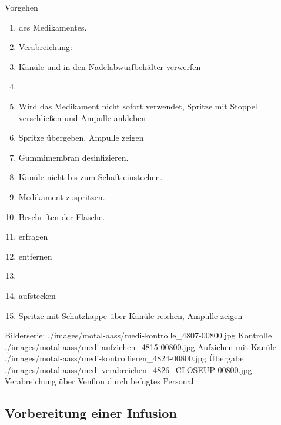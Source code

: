 \documentclass[
ngerman,
paper=a4,
asymmetric,
fontsize=8pt,
draft=false,
numbers=noenddot,
bibtotocnumbered,
footnotes=multiple,
toc=flat,
]{scrbook}
\begin{document}
\begin{ProcedureStepsWide}{Vorgehen}
\begin{enumerate}
  Beim Einführen der Kanüle in die Ampulle den
    Ampullenrand nicht berühren.
  \item {} des
  Medikamentes.
  \item Verabreichung:
    \item Kanüle  und in den
    Nadelabwurfbehälter verwerfen -- 
    \item {}
    \item Wird das Medikament nicht sofort verwendet, Spritze mit
    Stoppel verschließen und Ampulle ankleben
    \item Spritze übergeben, Ampulle zeigen
    \item Gummimembran desinfizieren.
    \item Kanüle nicht bis zum Schaft einstechen.
    \item Medikament zuspritzen.
    \item Beschriften der Flasche.
    \item {} erfragen
    \item {}  entfernen
    \item {}
    \item {} aufstecken
    \item Spritze mit Schutzkappe über Kanüle reichen, Ampulle zeigen
\end{enumerate}
\end{ProcedureStepsWide}


\begin{PictureSeriesWide}{}{Bilderserie:  }
{./images/motal-aass/medi-kontrolle_4807-00800.jpg}
{Kontrolle}
{./images/motal-aass/medi-aufziehen_4815-00800.jpg}
{Aufziehen mit Kanüle}
{./images/motal-aass/medi-kontrollieren_4824-00800.jpg}
{Übergabe}
{./images/motal-aass/medi-verabreichen_4826_CLOSEUP-00800.jpg}
{Verabreichung über Venflon durch befugtes Personal}
\end{PictureSeriesWide}



\subsection{Vorbereitung einer Infusion}
\label{topic:infusion}
\end{document}
